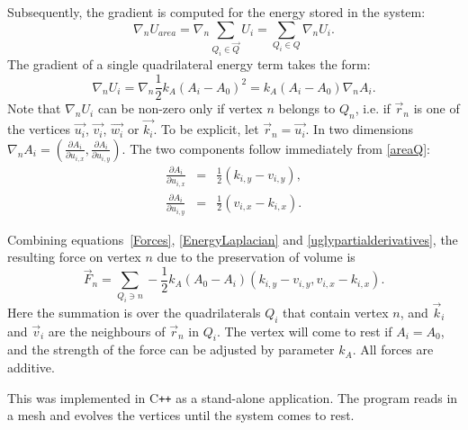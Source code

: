 Subsequently, the gradient is computed for the energy stored in the system:
\begin{equation}
\nabla_n U_{area}=\nabla_n \sum\limits_{Q_i\in \vec{Q}} U_i=\sum\limits_{Q_i\in Q} \nabla_n U_i.
\end{equation}
The gradient of a single quadrilateral energy term takes the form:
\begin{equation}
\nabla_n U_{i} = \nabla_n \frac{1}{2}k_A\left(A_i-A_0\right)^2 = k_A \left(A_i-A_0\right) \nabla_n A_i.
\label{EnergyLaplacian}
\end{equation}
Note that $\nabla_n U_{i}$ can be non-zero only if vertex $n$ belongs to $Q_n$, i.e. if $\vec{r}_n$ is one of the vertices $\vec{u_i}$, $\vec{v_i}$, $\vec{w_i}$ or $\vec{k_i}$. To be explicit, let $\vec{r}_n = \vec{u_i}$. In two dimensions $\nabla_n A_i = ( \frac{\partial A_i}{\partial u_{i,x}}, \frac{\partial A_i}{\partial u_{i,y}} )$. The two components follow immediately from \ref{areaQ}:
\begin{eqnarray}
\frac{\partial A_i}{\partial u_{i,x}}&=&
\frac{1}{2} \left( k_{i,y} - v_{i,y} \right),
\nonumber \\
\frac{\partial A_i}{\partial u_{i,y}}
&=&
\frac{1}{2} \left( v_{i,x} - k_{i,x} \right).
\label{uglypartialderivatives}
\end{eqnarray}

Combining equations~\ref{Forces}, \ref{EnergyLaplacian} and \ref{uglypartialderivatives}, the resulting force on vertex $n$ due to the preservation of volume is
\begin{equation}
\vec{F}_n = \sum\limits_{Q_i \ni n} -\frac{1}{2}k_A (A_0-A_i) \left( k_{i,y} - v_{i,y}, v_{i,x} - k_{i,x}\right).
\end{equation}
Here the summation is over the quadrilaterals $Q_i$ that contain vertex $n$, and $\vec{k}_i$ and $\vec{v}_i$ are the neighbours of $\vec{r}_n$ in $Q_i$. The vertex will come to rest if $A_i=A_0$, and the strength of the force can be adjusted by parameter $k_A$. All forces are additive.


This was implemented in C\texttt{++} as a stand-alone application. The program reads in a mesh and evolves the vertices until the system comes to rest. 
